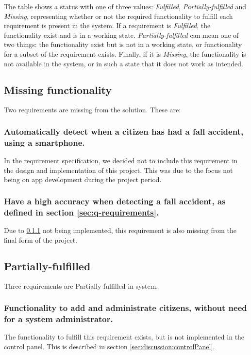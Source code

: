 The table shows a status with one of three values: \textit{Fulfilled}, \textit{Partially-fulfilled} and \textit{Missing}, representing whether or not the required functionality to fulfill each requirement is present in the system. If a requirement is \textit{Fulfilled}, the functionality exist and is in a working state. \textit{Partially-fulfilled} can mean one of two things: the functionality exist but is not in a working state, or functionality for a subset of the requirement exists. Finally, if it is \textit{Missing}, the functionality is not available in the system, or in such a state that it does not work as intended.

\subsection{Missing functionality}
Two requirements are missing from the solution. These are:

\subsubsection{Automatically detect when a citizen has had a fall accident, using a smartphone.}\label{autofalldetect}
In the requirement specification, we decided not to include this requirement in the design and implementation of this project. This was due to the focus not being on app development during the project period.

\subsubsection{Have a high accuracy when detecting a fall accident, as defined in section \ref{sec:q-requirements}.}
Due to \ref{autofalldetect} not being implemented, this requirement is also missing from the final form of the project.

\subsection{Partially-fulfilled}
Three requirements are Partially fulfilled in system.

\subsubsection{Functionality to add and administrate citizens, without need for a system administrator.}
The functionality to fulfill this requirement exists, but is not implemented in the control panel. This is described in section \ref{sec:discussion:controlPanel}.


